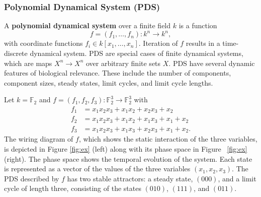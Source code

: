 \documentclass[10pt]{bmc_article}
\newenvironment{example}[1][Example]{\begin{trivlist}
\item[\hskip \labelsep {\bfseries #1}]}{\end{trivlist}}
\begin{document}
\subsubsection{Polynomial Dynamical System (PDS)}\label{pds}
A {\bf polynomial dynamical system} \cite{JLSS} over a finite field $k$ is a function
$$f = (f_1, \ldots, f_n) : k^n \rightarrow k^n,$$
with coordinate functions $f_i \in k[x_1, \ldots , x_n]$. Iteration of $f$ results
in a time-discrete dynamical system. PDS are special cases of finite
dynamical systems, which are maps $X^n \rightarrow   X^n$ over arbitrary
finite sets $X$.
PDS have several dynamic features of biological
relevance. These include the number of components, component sizes, steady states, limit cycles, and limit cycle lengths.
\begin{example}
Let $k= \mathbb F_2$ and $f = (f_1, f_2, f_3) : \mathbb F_2^3 \rightarrow
\mathbb F_2^3$ with
\begin{align*}
f_1 &= x_1x_2x_3+x_1x_2+x_2x_3+x_2 \\
f_2 &= x_1x_2x_3+x_1x_2+x_1x_3+x_1+x_2 \\
f_3 &= x_1x_2x_3+x_1x_3+x_2x_3+x_1+x_2.
\end{align*}
The wiring diagram of $f$, which shows the static interaction of the three
variables, is
depicted in Figure \ref{fig:ex} (left) along with its phase space in Figure
~\ref{fig:ex} (right).
The phase space shows the temporal evolution of the system. Each state is
represented as a vector of the values of the three variables $(x_1, x_2,
x_3)$.
The PDS described by $f$ has
two stable attractors: a  steady state, $(000)$, and a limit cycle of length
three, consisting of the states $(010)$, $(111)$, and $(011)$.
\end{example}
\end{document}
